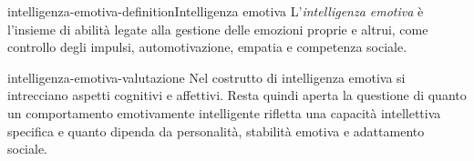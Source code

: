 \documentclass[preview]{standalone}
\begin{document}

\begin{snippetdefinition}{intelligenza-emotiva-definition}{Intelligenza emotiva}
    L'\emph{intelligenza emotiva} è l'insieme di abilità legate alla gestione
    delle emozioni proprie e altrui, come controllo degli impulsi,
    automotivazione, empatia e competenza sociale.
\end{snippetdefinition}

\begin{snippet}{intelligenza-emotiva-valutazione}
    Nel costrutto di intelligenza emotiva si intrecciano aspetti cognitivi e
    affettivi. Resta quindi aperta la questione di quanto un comportamento
    emotivamente intelligente rifletta una capacità intellettiva specifica e
    quanto dipenda da personalità, stabilità emotiva e adattamento sociale.
\end{snippet}
\end{document}

